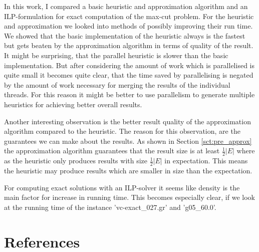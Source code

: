 \documentclass[twocolumn]{article}
\begin{document}
In this work, I compared a basic heuristic and approximation algorithm and an ILP-formulation 
for exact computation of the max-cut problem.
For the heuristic and approximation we looked into methods of possibly improving their run time.
We showed that the basic implementation of the heuristic always is the fastest but gets beaten
by the approximation algorithm in terms of quality of the result. It might be surprising, that
the parallel heuristic is slower than the basic implementation.
But after considering the amount of work which is parallelised is quite small it becomes quite
clear, that the time saved by parallelising is negated by the amount of work necessary for
merging the results of the individual threads.
For this reason it might be better to use parallelism to generate multiple heuristics for
achieving better overall results. 

Another interesting observation is the better result quality of the approximation algorithm
compared to the heuristic.
The reason for this observation, are the guarantees we can make about the results.
As shown in Section \ref{sct:pre_approx} the approximation algorithm guarantees that the
result size is at least $\frac{1}{2}|E|$ where as the heuristic only produces results
with size $\frac{1}{2}|E|$ in expectation. This means the heuristic may produce results
which are smaller in size than the expectation.

For computing exact solutions with an ILP-solver it seems like density is the main factor
for increase in running time. This becomes especially clear, if we look at the running time
of the instance 'vc-exact\_027.gr' and 'g05\_60.0'.

\section{References}



\end{document}

